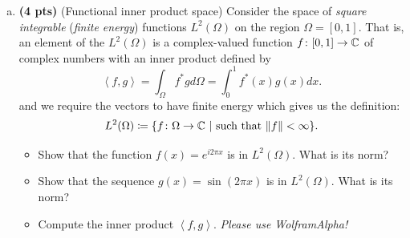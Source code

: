 \documentclass[12pt]{article} %
\newcommand{\innprod}[2]{\left\langle #1, #2\right\rangle}
\begin{document}
\begin{problem}
\begin{enumerate}[(a)]
\item \textbf{(4 pts)} (Functional inner product space) Consider the space of \emph{square integrable} (\emph{finite energy}) functions $L^2(\Omega)$ on the region $\Omega=[0,1]$. That is, an element of the $L^2(\Omega)$ is a complex-valued function $f \colon [0,1] \to \mathbb{C}$ of complex numbers with an inner product defined by
\[
\innprod{f}{g} = \int_\Omega f^*g d\Omega = \int_0^1 f^*(x) g(x)dx.
\]
and we require the vectors to have finite energy which gives us the definition:
\[
L^2(\Omega) \coloneqq \{ f\colon \Omega \to \mathbb{C} ~|~ \textrm{such that $\|f\|<\infty$}\}.
\]
\begin{itemize}
\item Show that the function $f(x)= e^{i2\pi x}$ is in $L^2(\Omega)$. What is its norm? 
\item Show that the sequence $g(x) = \sin(2\pi x)$ is in $L^2(\Omega)$. What is its norm?
\item Compute the inner product $\innprod{f}{g}$. \emph{Please use WolframAlpha!}
\end{itemize}
\end{enumerate}
\end{problem}
\end{document}
